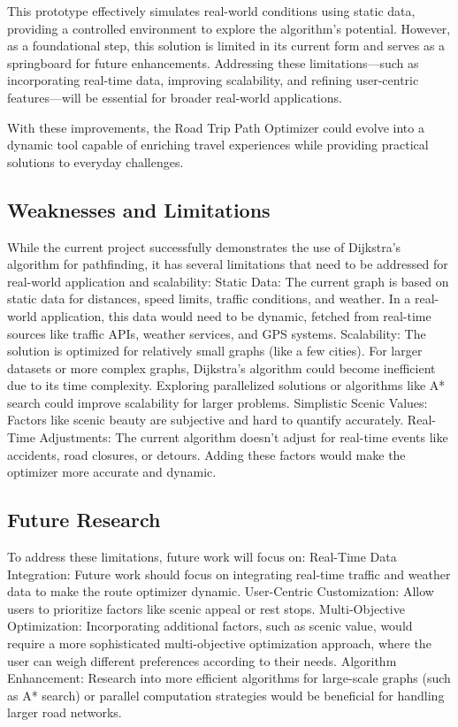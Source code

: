 \documentclass{article}
\begin{document}
This prototype effectively simulates real-world conditions using static data, providing a controlled environment to explore the algorithm's potential. However, as a foundational step, this solution is limited in its current form and serves as a springboard for future enhancements. Addressing these limitations—such as incorporating real-time data, improving scalability, and refining user-centric features—will be essential for broader real-world applications.

With these improvements, the Road Trip Path Optimizer could evolve into a dynamic tool capable of enriching travel experiences while providing practical solutions to everyday challenges.

\subsection{Weaknesses and Limitations}
While the current project successfully demonstrates the use of Dijkstra’s algorithm for pathfinding, it has several limitations that need to be addressed for real-world application and scalability:
Static Data: The current graph is based on static data for distances, speed limits, traffic conditions, and weather. In a real-world application, this data would need to be dynamic, fetched from real-time sources like traffic APIs, weather services, and GPS systems.
Scalability: The solution is optimized for relatively small graphs (like a few cities). For larger datasets or more complex graphs, Dijkstra’s algorithm could become inefficient due to its time complexity. Exploring parallelized solutions or algorithms like A* search could improve scalability for larger problems.
Simplistic Scenic Values: Factors like scenic beauty are subjective and hard to quantify accurately.
Real-Time Adjustments: The current algorithm doesn't adjust for real-time events like accidents, road closures, or detours. Adding these factors would make the optimizer more accurate and dynamic.

\subsection{Future Research}
To address these limitations, future work will focus on:
Real-Time Data Integration: Future work should focus on integrating real-time traffic and weather data to make the route optimizer dynamic.
User-Centric Customization: Allow users to prioritize factors like scenic appeal or rest stops.
Multi-Objective Optimization: Incorporating additional factors, such as scenic value, would require a more sophisticated multi-objective optimization approach, where the user can weigh different preferences according to their needs.
Algorithm Enhancement: Research into more efficient algorithms for large-scale graphs (such as A* search) or parallel computation strategies would be beneficial for handling larger road networks.
\end{document}
